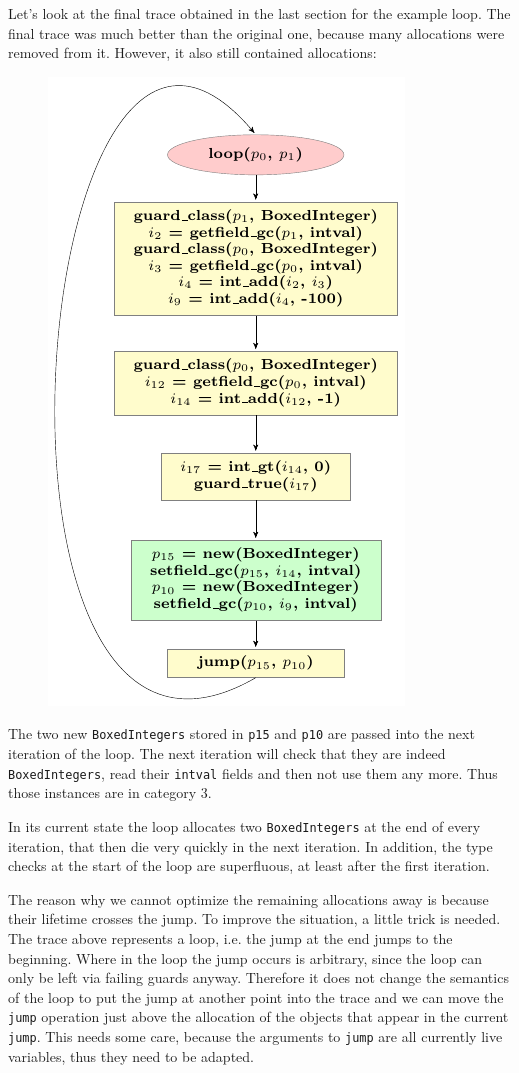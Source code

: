 \documentclass{sigplanconf}
\begin{document}
Let's look at the final trace obtained in the last section for the example loop.
The final trace was much better than the original one, because many allocations
were removed from it. However, it also still contained allocations:

\begin{figure}
\includegraphics{figures/step1.pdf}
\end{figure}

The two new \texttt{BoxedIntegers} stored in \texttt{p15} and \texttt{p10} are passed into
the next iteration of the loop. The next iteration will check that they are
indeed \texttt{BoxedIntegers}, read their \texttt{intval} fields and then not use them
any more. Thus those instances are in category 3.

In its current state the loop
allocates two \texttt{BoxedIntegers} at the end of every iteration, that then die
very quickly in the next iteration. In addition, the type checks at the start
of the loop are superfluous, at least after the first iteration.

The reason why we cannot optimize the remaining allocations away is because
their lifetime crosses the jump. To improve the situation, a little trick is
needed. The trace above represents a loop, i.e. the jump at the end jumps to
the beginning. Where in the loop the jump occurs is arbitrary, since the loop
can only be left via failing guards anyway. Therefore it does not change the
semantics of the loop to put the jump at another point into the trace and we
can move the \texttt{jump} operation just above the allocation of the objects that
appear in the current \texttt{jump}. This needs some care, because the arguments to
\texttt{jump} are all currently live variables, thus they need to be adapted.
\end{document}
